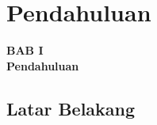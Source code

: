 \documentclass[11pt]{article}
\date{}
\begin{document}
	
	\onehalfspacing
	
	\newpage
	
	\setcounter{page}{9}
	
	\setcounter{section}{0}
	
	\setcounter{figure}{0}
	
	\section{Pendahuluan}
	
	\begin{center}
		{\large \textbf{BAB I}} \\
		{\large \textbf{Pendahuluan}}
	\end{center}
	
	\subsection{Latar Belakang}
	
\end{document}
